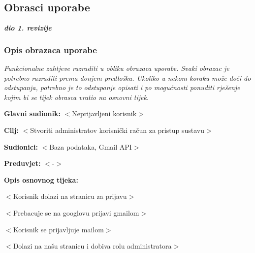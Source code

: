 			\eject 
			


			\subsection{Obrasci uporabe}
				
				\textbf{\textit{dio 1. revizije}}
				
				\subsubsection{Opis obrazaca uporabe}
					\textit{Funkcionalne zahtjeve razraditi u obliku obrazaca uporabe. Svaki obrazac je potrebno razraditi prema donjem predlošku. Ukoliko u nekom koraku može doći do odstupanja, potrebno je to odstupanje opisati i po mogućnosti ponuditi rješenje kojim bi se tijek obrasca vratio na osnovni tijek.}\\

					\noindent {}
					\begin{packed_item}

						\item \textbf{Glavni sudionik: }$<$Neprijavljeni korisnik$>$
						\item  \textbf{Cilj:} $<$Stvoriti administratov korisnički račun za pristup sustavu$>$
						\item  \textbf{Sudionici:} $<$Baza podataka, Gmail API$>$
						\item  \textbf{Preduvjet:} $<$-$>$
						\item  \textbf{Opis osnovnog tijeka:}

						\item[] \begin{packed_enum}

							\item $<$Korisnik dolazi na stranicu za prijavu$>$
							\item $<$Prebacuje se na googlovu prijavi gmailom$>$
							\item $<$Korisnik se prijavljuje mailom$>$
							\item $<$Dolazi na našu stranicu i dobiva rolu administratora$>$
						\end{packed_enum}
					\end{packed_item}

